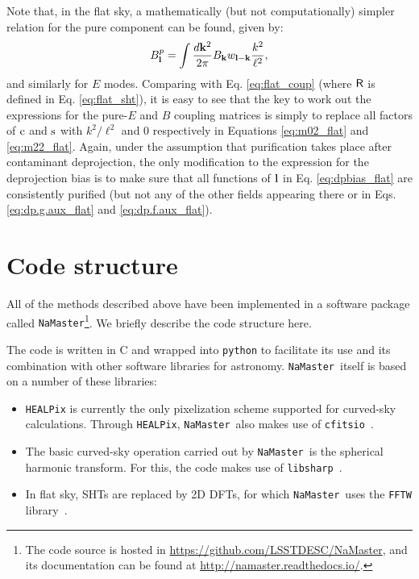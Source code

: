 \documentclass[usenatbib]{mnrasb}
\newcommand{\nmt}{{\tt NaMaster}}
\begin{document}
        Note that, in the flat sky, a mathematically (but not computationally) simpler relation for the pure component can be found, given by:
        \begin{equation}
          B^p_{\bf l}=\int\frac{d{\bf k}^2}{2\pi}B_{\bf k}w_{{\bf l}-{\bf k}}\frac{k^2}{\ell^2},
        \end{equation}
        and similarly for $E$ modes. Comparing with Eq. \ref{eq:flat_coup} (where  ${\sf R}$ is defined in Eq. \ref{eq:flat_sht}), it is easy to see that the key to work out the expressions for the pure-$E$ and $B$ coupling matrices is simply to replace all factors of ${\rm c}$ and ${\rm s}$ with $k^2/\ell^2$ and 0 respectively in Equations \ref{eq:m02_flat} and \ref{eq:m22_flat}. Again, under the assumption that purification takes place after contaminant deprojection, the only modification to the expression for the deprojection bias is to make sure that all functions of ${\bf l}$ in Eq. \ref{eq:dpbias_flat} are consistently purified (but not any of the other fields appearing there or in Eqs. \ref{eq:dp.g.aux_flat} and \ref{eq:dp.f.aux_flat}).


  \section{Code structure}\label{sec:structure}
    All of the methods described above have been implemented in a software package called \nmt\footnote{The code source is hosted in \url{https://github.com/LSSTDESC/NaMaster}, and its documentation can be found at \url{http://namaster.readthedocs.io/}.}. We briefly describe the code structure here.
    
    The code is written in C and wrapped into {\tt python} to facilitate its use and its combination with other software libraries for astronomy. \nmt~itself is based on a number of these libraries:
    \begin{itemize}
      \item {\tt HEALPix} \citep{2005ApJ...622..759G} is currently the only pixelization scheme supported for curved-sky calculations. Through {\tt HEALPix}, \nmt~also makes use of {\tt cfitsio}~\citep{1999ASPC..172..487P}.
      \item The basic curved-sky operation carried out by \nmt~is the spherical harmonic transform. For this, the code makes use of {\tt libsharp}~\citep{2013A&A...554A.112R}.
      \item In flat sky, SHTs are replaced by 2D DFTs, for which \nmt~uses the {\tt FFTW} library~\citep{FFTW05}.
    \end{itemize}
    
\end{document}

